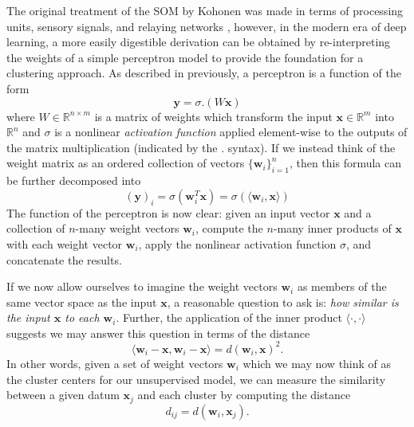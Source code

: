 The original treatment of the SOM by Kohonen was made in terms of processing units, sensory signals, and relaying networks \cite{kohonen-original}, however, in the modern era of deep learning, a more easily digestible derivation can be obtained by re-interpreting the weights of a simple perceptron model to provide the foundation for a clustering approach. As described in previously, a perceptron is a function of the form
\begin{equation}
    \mathbf{y} = \sigma.\left(W\mathbf{x}\right)
\end{equation}
where $W\in\mathbb{R}^{n\times m}$ is a matrix of weights which transform the input $\mathbf{x}\in\mathbb{R}^m$ into $\mathbb{R}^n$ and $\sigma$ is a nonlinear \textit{activation function} applied element-wise to the outputs of the matrix multiplication (indicated by the $.$ syntax). If we instead think of the weight matrix as an ordered collection of vectors $\{\mathbf{w}_i\}_{i=1}^{n}$, then this formula can be further decomposed into
\begin{equation}
    (\mathbf{y})_i = \sigma(\mathbf{w}_i^T\mathbf{x}) = \sigma(\langle \mathbf{w}_i, \mathbf{x} \rangle)
\end{equation}
The function of the perceptron is now clear: given an input vector $\mathbf{x}$ and a collection of $n$-many weight vectors $\mathbf{w}_i$, compute the $n$-many inner products of $\mathbf{x}$ with each weight vector $\mathbf{w}_i$, apply the nonlinear activation function $\sigma$, and concatenate the results.

If we now allow ourselves to imagine the weight vectors $\mathbf{w}_i$ as members of the same vector space as the input $\mathbf{x}$, a reasonable question to ask is: \textit{how similar is the input $\mathbf{x}$ to each $\mathbf{w}_i$}. Further, the application of the inner product $\langle \cdot,\cdot \rangle$ suggests we may answer this question in terms of the distance
\begin{equation}
    \langle \mathbf{w}_i-\mathbf{x},  \mathbf{w}_i-\mathbf{x}\rangle = d(\mathbf{w}_i, \mathbf{x})^2.
\end{equation}
In other words, given a set of weight vectors $\mathbf{w}_i$ which we may now think of as the cluster centers for our unsupervised model, we can measure the similarity between a given datum $\mathbf{x}_j$ and each cluster by computing the distance
\begin{equation}
    d_{ij} = d\left(\mathbf{w}_i, \mathbf{x}_j \right).
\end{equation}

